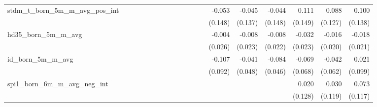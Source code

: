 \begin{tabular}{lrrrrrrrrrrrrrrrrrr}
stdm\_t\_born\_5m\_m\_avg\_pos\_int         &             &             &             &             &             &             &             &             &             &             &             &             &      -0.053 &      -0.045 &      -0.044 &       0.111 &       0.088 &       0.100 \\ 
                                            &             &             &             &             &             &             &             &             &             &             &             &             &     (0.148) &     (0.137) &     (0.148) &     (0.149) &     (0.127) &     (0.138) \\ 
hd35\_born\_5m\_m\_avg                      &             &             &             &             &             &             &             &             &             &             &             &             &      -0.004 &      -0.008 &      -0.008 &      -0.032 &      -0.016 &      -0.018 \\ 
                                            &             &             &             &             &             &             &             &             &             &             &             &             &     (0.026) &     (0.023) &     (0.022) &     (0.023) &     (0.020) &     (0.021) \\ 
id\_born\_5m\_m\_avg                        &             &             &             &             &             &             &             &             &             &             &             &             &      -0.107 &      -0.041 &      -0.084 &      -0.069 &      -0.042 &       0.021 \\ 
                                            &             &             &             &             &             &             &             &             &             &             &             &             &     (0.092) &     (0.048) &     (0.046) &     (0.068) &     (0.062) &     (0.099) \\ 
spi1\_born\_6m\_m\_avg\_neg\_int            &             &             &             &             &             &             &             &             &             &             &             &             &             &             &             &       0.020 &       0.030 &       0.073 \\ 
                                            &             &             &             &             &             &             &             &             &             &             &             &             &             &             &             &     (0.128) &     (0.119) &     (0.117) \\ 

\end{tabular}

